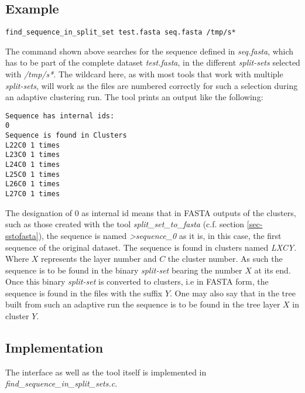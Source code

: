 \subsection{Example}
\begin{lstlisting}
find_sequence_in_split_set test.fasta seq.fasta /tmp/s*
\end{lstlisting}
The command shown above searches for the sequence defined
in \emph{seq.fasta}, which has to be part of the complete dataset
\emph{test.fasta},
in the different \emph{split-sets} selected with
\emph{/tmp/s*}. The wildcard here, as with most tools that work with
multiple \emph{split-sets}, will work as the files are numbered correctly for
such a selection during an adaptive clustering run.
The tool prints an output like the following:
\begin{lstlisting}
Sequence has internal ids: 
0 
Sequence is found in Clusters
L22C0 1 times
L23C0 1 times
L24C0 1 times
L25C0 1 times
L26C0 1 times
L27C0 1 times
\end{lstlisting}
The designation of 0 as internal id means that in FASTA outputs of
the clusters, such as those 
created with the tool \emph{split\_set\_to\_fasta} (c.f. section
\ref{sec-sstofasta}), the sequence is
named \emph{>sequence\_0} as it is,
in this case, the first sequence of the original dataset. The sequence
is found in clusters named \emph{LXCY}. Where $X$ represents the layer
number and $C$ the cluster number. As such the sequence is to be found in the
binary \emph{split-set} bearing the number $X$ at its end. Once this
binary \emph{split-set} is converted to clusters, i.e in FASTA form,
the sequence is found in the files with the suffix $Y$. One may also
say that in the tree built from such an adaptive run the sequence is
to be found in the tree layer $X$ in cluster $Y$.

\subsection{Implementation}
The interface as well as the tool itself is implemented in \newline
\emph{find\_sequence\_in\_split\_sets.c}.
